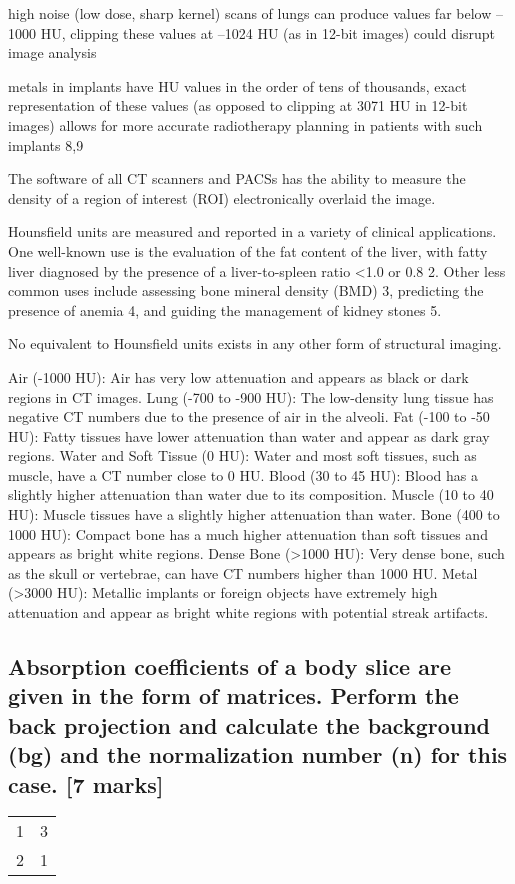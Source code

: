 \documentclass{assignment}
\begin{document}
\begin{problem}
{high noise (low dose, sharp kernel) scans of lungs can produce values far below –1000 HU, clipping these values at –1024 HU (as in 12-bit images) could disrupt image analysis

metals in implants have HU values in the order of tens of thousands, exact representation of these values (as opposed to clipping at 3071 HU in 12-bit images) allows for more accurate radiotherapy planning in patients with such implants 8,9

The software of all CT scanners and PACSs has the ability to measure the density of a region of interest (ROI) electronically overlaid the image.

Hounsfield units are measured and reported in a variety of clinical applications. One well-known use is the evaluation of the fat content of the liver, with fatty liver diagnosed by the presence of a liver-to-spleen ratio <1.0 or 0.8 2. Other less common uses include assessing bone mineral density (BMD) 3, predicting the presence of anemia 4, and guiding the management of kidney stones 5.

No equivalent to Hounsfield units exists in any other form of structural imaging.

Air (-1000 HU): Air has very low attenuation and appears as black or dark regions in CT images.
Lung (-700 to -900 HU): The low-density lung tissue has negative CT numbers due to the presence of air in the alveoli.
Fat (-100 to -50 HU): Fatty tissues have lower attenuation than water and appear as dark gray regions.
Water and Soft Tissue (0 HU): Water and most soft tissues, such as muscle, have a CT number close to 0 HU.
Blood (30 to 45 HU): Blood has a slightly higher attenuation than water due to its composition.
Muscle (10 to 40 HU): Muscle tissues have a slightly higher attenuation than water.
Bone (400 to 1000 HU): Compact bone has a much higher attenuation than soft tissues and appears as bright white regions.
Dense Bone (>1000 HU): Very dense bone, such as the skull or vertebrae, can have CT numbers higher than 1000 HU.
Metal (>3000 HU): Metallic implants or foreign objects have extremely high attenuation and appear as bright white regions with potential streak artifacts.}
\subsection{Absorption coefficients of a body slice are given in the form of matrices. Perform the back projection and calculate the background (bg) and the normalization number (n) for this case.
[7 marks]
}
\begin{center}
\begin{tabular}{ c | c  }
 1 & 3   \\ 
 2 & 1   \\       
\end{tabular}
\end{center}
\newpage

\end{problem}
\end{document}
